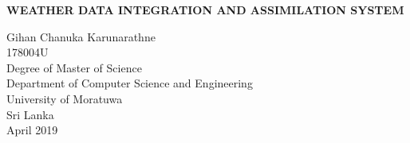 \documentclass[a4paper,oneside,12pt]{report}
\begin{document}
\begin{titlepage}
    \begin{center}
        \Large{
        \textbf{WEATHER DATA INTEGRATION AND ASSIMILATION SYSTEM}}\\
        \vspace{144pt}
  \large      
       
        
        
        Gihan Chanuka Karunarathne\\
        \vspace{24pt}
      178004U\\
         \vspace{72pt}
        Degree of Master of Science\\
       
        
       \vspace{72pt}
        \large
        Department of Computer Science and Engineering\\
        \vspace{24pt}
        University of Moratuwa\\
        Sri Lanka\\
        \vspace{32pt}
        April 2019
        
    \end{center}
\end{titlepage}
\end{document}
